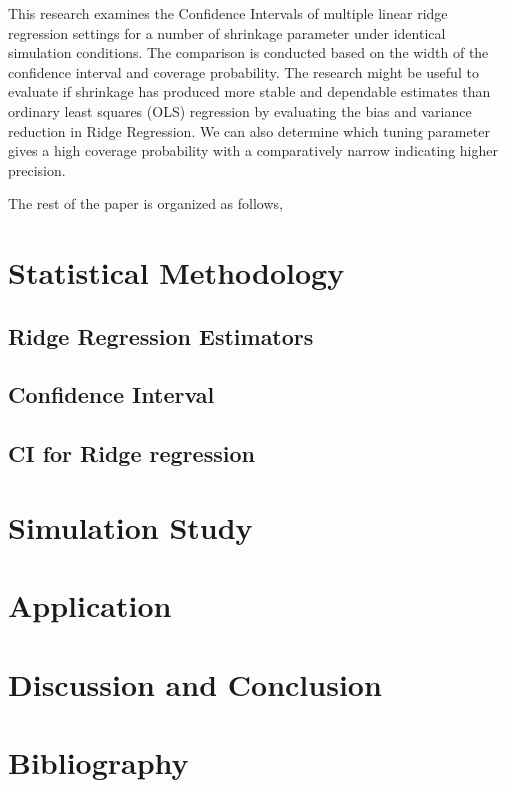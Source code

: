 \documentclass[
]{interact}
\begin{document}
This research examines the Confidence Intervals of multiple linear ridge
regression settings for a number of shrinkage parameter under identical
simulation conditions. The comparison is conducted based on the width of
the confidence interval and coverage probability. The research might be
useful to evaluate if shrinkage has produced more stable and dependable
estimates than ordinary least squares (OLS) regression by evaluating the
bias and variance reduction in Ridge Regression. We can also determine
which tuning parameter gives a high coverage probability with a
comparatively narrow indicating higher precision.

The rest of the paper is organized as follows,

\section{Statistical Methodology}\label{statistical-methodology}

\subsection{Ridge Regression
Estimators}\label{ridge-regression-estimators}

\subsection{Confidence Interval}\label{confidence-interval}

\subsection{CI for Ridge regression}\label{ci-for-ridge-regression}

\section{Simulation Study}\label{simulation-study}

\section{Application}\label{application}

\section{Discussion and Conclusion}\label{discussion-and-conclusion}

\section*{Bibliography}\label{bibliography}
\end{document}
